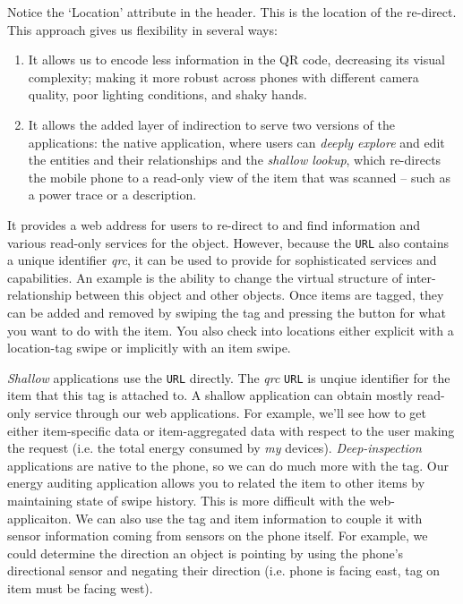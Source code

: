 Notice the `Location' attribute in the header.  This is the location of the re-direct.  This approach gives us
flexibility in several ways:

\begin{enumerate}
\item It allows us to encode less information in the QR code, decreasing its visual complexity; making it more
		robust across phones with different camera quality, poor lighting conditions, and shaky hands.
\item It allows the added layer of indirection to serve two versions of the applications:  the native application,
		where users can \emph{deeply explore} and edit the entities and their relationships and the \emph{shallow lookup}, 
		which re-directs the mobile phone to a read-only view of the item that was scanned -- such as a power trace or 
		a description.
\end{enumerate}


It provides a web address for users to re-direct to and find information and various read-only services for the object.  However, because
the \texttt{URL} also contains a unique identifier \emph{qrc}, it can be used to provide for sophisticated services and capabilities.
An example is the ability to change the virtual structure of inter-relationship between this object and other objects.  
Once items are tagged, they can be added and removed by swiping the tag and pressing the button for what you want to do with
the item.  You also check into locations either explicit with a location-tag swipe or implicitly with an item swipe.

\emph{Shallow} applications
use the \texttt{URL} directly.  The \emph{qrc} \texttt{URL} is unqiue identifier for the item that this tag is attached to.
A shallow application can obtain mostly read-only service through our web applications.  For example, we'll see how
to get either item-specific data or item-aggregated data with respect to the user making the request (i.e. the total
energy consumed by \emph{my} devices).  \emph{Deep-inspection} applications are native to the phone, so we can do much
more with the tag.  Our energy auditing application allows you to related the item to other items by maintaining state of swipe
history.  This is more difficult with the web-applicaiton.  We can also use the tag and item information to couple it with
sensor information coming from sensors on the phone itself.  For example, we could determine the direction an object
is pointing by using the phone's directional sensor and negating their direction (i.e. phone is facing east, tag on item must
be facing west).

